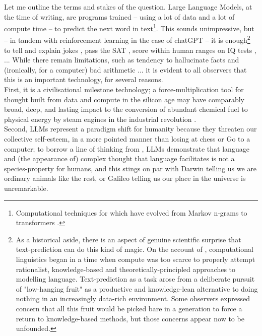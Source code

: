 Let me outline the terms and stakes of the question. Large Language Models, at the time of writing, are programs trained -- using a lot of data and a lot of compute time -- to predict the next word in text\footnote{Computational techniques for which have evolved from Markov n-grams to transformers \cite{vaswani_attention_2017}.}. This sounds unimpressive, but -- in tandem with reinforcement learning in the case of chatGPT \cite{openai_chatgpt_2022} -- it is enough\footnote{As a historical aside, there is an aspect of genuine scientific surprise that text-prediction can do this kind of magic. On the account of \cite{mcshane_linguistics_2021}, computational linguistics began in a time when compute was too scarce to properly attempt rationalist, knowledge-based and theoretically-principled approaches to modelling language. Text-prediction as a task arose from a deliberate pursuit of "low-hanging fruit" as a productive and knowledge-lean alternative to doing nothing in an increasingly data-rich environment. Some observers \cite{church_pendulum_2011} expressed concern that all this fruit would be picked bare in a generation to force a return to knowledge-based methods, but those concerns appear now to be unfounded.} to tell and explain jokes \cite{bastian_google_2022}, pass the SAT \cite{}, score within human ranges on IQ tests \cite{}, ... While there remain limitations, such as tendency to hallucinate facts \cite{} and (ironically, for a computer) bad arithmetic \cite{}... it is evident to all observers that this is an important technology, for several reasons.\\
First, it is a civilisational milestone technology; a force-multiplication tool for thought built from data and compute in the silicon age may have comparably broad, deep, and lasting impact to the conversion of abundant chemical fuel to physical energy by steam engines in the industrial revolution \cite{}.\\
Second, LLMs represent a paradigm shift for humanity because they threaten our collective self-esteem, in a more pointed manner than losing at chess or Go to a computer; to borrow a line of thinking from \cite{}, LLMs demonstrate that language and (the appearance of) complex thought that language facilitates is not a species-property for humans, and this stings on par with Darwin telling us we are ordinary animals like the rest, or Galileo telling us our place in the universe is unremarkable.\\
